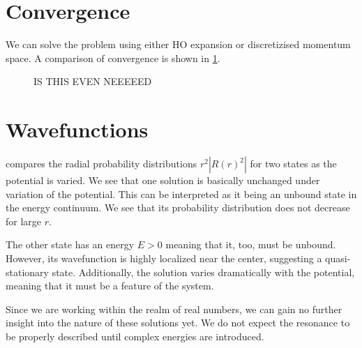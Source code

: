 \section{Convergence}
We can solve the problem using either HO expansion or discretizised momentum space. A comparison of convergence is shown in \cref{fig:HO vs mom}.
\begin{figure}
  \centering
  \caption{IS THIS EVEN NEEEEED}
  \label{fig:HO vs mom}
\end{figure}

\section{Wavefunctions}

 compares the radial probability distributions $r^2|R(r)^2|$ for two states as the potential is varied. We see that one solution is basically unchanged under variation of the potential. This can be interpreted as it being an unbound state in the energy continuum. We see that its probability distribution does not decrease for large $r$.

The other state has an energy $E>0$ meaning that it, too, must be unbound. However, its wavefunction is highly localized near the center, suggesting a quasi-stationary state. Additionally, the solution varies dramatically with the potential, meaning that it must be a feature of the system. 

Since we are working within the realm of real numbers, we can gain no further insight into the nature of these solutions yet. We do not expect the resonance to be properly described until complex energies are introduced.



